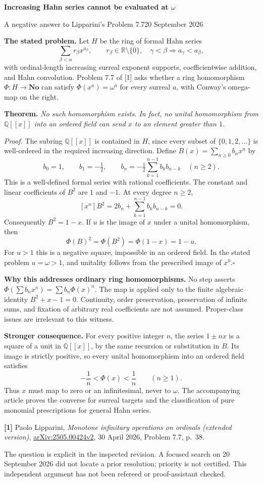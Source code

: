 \documentclass[10pt,letterpaper]{article}
\newcommand{\No}{\mathbf{No}}
\newcommand{\Q}{\mathbb Q}
\begin{document}
{\Large\bfseries\color{olive}Increasing Hahn series cannot be evaluated at $\omega$}\par
{\small A negative answer to Lipparini's Problem 7.7\hfill20 September 2026}
\vspace{.6em}

\textbf{The stated problem.}
Let $H$ be the ring of formal Hahn series
\[
 \sum_{\beta<\alpha}r_\beta x^{a_\beta},\qquad
 r_\beta\in\mathbb R\setminus\{0\},\quad
 \gamma<\beta\Longrightarrow a_\gamma<a_\beta,
\]
with ordinal-length increasing surreal exponent supports, coefficientwise
addition, and Hahn convolution. Problem 7.7 of [1] asks whether a ring
homomorphism $\Phi:H\to\No$ can satisfy $\Phi(x^a)=\omega^a$ for every
surreal $a$, with Conway's omega-map on the right.

\textbf{Theorem.} \emph{No such homomorphism exists. In fact, no unital
homomorphism from $\Q[[x]]$ into an ordered field can send $x$ to an element
greater than $1$.}

\textit{Proof.}
The subring $\Q[[x]]$ is contained in $H$, since every subset of
$\{0,1,2,\ldots\}$ is well-ordered in the required increasing direction.
Define $B(x)=\sum_{n\ge0}b_nx^n$ by
\[
 b_0=1,\qquad b_1=-\tfrac12,\qquad
 b_n=-\tfrac12\sum_{k=1}^{n-1}b_kb_{n-k}\quad(n\ge2).
\]
This is a well-defined formal series with rational coefficients. The constant
and linear coefficients of $B^2$ are $1$ and $-1$. At every degree $n\ge2$,
\[
 [x^n]B^2=2b_n+\sum_{k=1}^{n-1}b_kb_{n-k}=0.
\]
Consequently $B^2=1-x$. If $u$ is the image of $x$ under a unital homomorphism,
then
\[
 \Phi(B)^2=\Phi(B^2)=\Phi(1-x)=1-u.
\]
For $u>1$ this is a negative square, impossible in an ordered field. In the
stated problem $u=\omega>1$, and unitality follows from the prescribed image
of $x^0$.\hfill$\square$

\textbf{Why this addresses ordinary ring homomorphisms.}
No step asserts $\Phi(\sum b_nx^n)=\sum b_n\Phi(x)^n$.
The map is applied only to the finite algebraic identity $B^2+x-1=0$.
Continuity, order preservation, preservation of infinite sums, and fixation
of arbitrary real coefficients are not assumed. Proper-class issues are
irrelevant to this witness.

\textbf{Stronger consequence.}
For every positive integer $n$, the series $1\pm nx$ is a square of a unit
in $\Q[[x]]$, by the same recursion or substitution in $B$.
Its image is strictly positive, so every unital homomorphism into an ordered
field satisfies
\[
 -\frac1n<\Phi(x)<\frac1n\qquad(n\ge1).
\]
Thus $x$ must map to zero or an infinitesimal, never to $\omega$.
The accompanying article proves the converse for surreal targets and the
classification of pure monomial prescriptions for general Hahn series.

\vfill
{\small
\textbf{[1]} Paolo Lipparini, \emph{Monotone infinitary operations on ordinals
(extended version)}, \href{https://arxiv.org/abs/2505.00424v2}{arXiv:2505.00424v2},
30 April 2026, Problem 7.7, p.~38.

The question is explicit in the inspected revision. A focused search on
20 September 2026 did not locate a prior resolution; priority is not certified.
This independent argument has not been refereed or proof-assistant checked.}
\end{document}
